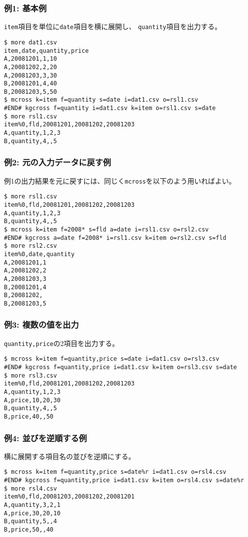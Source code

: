 \subsubsection*{例1: 基本例}

\verb|item|項目を単位に\verb|date|項目を横に展開し、
\verb|quantity|項目を出力する。


\begin{Verbatim}[baselinestretch=0.7,frame=single]
$ more dat1.csv
item,date,quantity,price
A,20081201,1,10
A,20081202,2,20
A,20081203,3,30
B,20081201,4,40
B,20081203,5,50
$ mcross k=item f=quantity s=date i=dat1.csv o=rsl1.csv
#END# kgcross f=quantity i=dat1.csv k=item o=rsl1.csv s=date
$ more rsl1.csv
item%0,fld,20081201,20081202,20081203
A,quantity,1,2,3
B,quantity,4,,5
\end{Verbatim}
\subsubsection*{例2: 元の入力データに戻す例}

例1の出力結果を元に戻すには、同じく\verb|mcross|を以下のよう用いればよい。


\begin{Verbatim}[baselinestretch=0.7,frame=single]
$ more rsl1.csv
item%0,fld,20081201,20081202,20081203
A,quantity,1,2,3
B,quantity,4,,5
$ mcross k=item f=2008* s=fld a=date i=rsl1.csv o=rsl2.csv
#END# kgcross a=date f=2008* i=rsl1.csv k=item o=rsl2.csv s=fld
$ more rsl2.csv
item%0,date,quantity
A,20081201,1
A,20081202,2
A,20081203,3
B,20081201,4
B,20081202,
B,20081203,5
\end{Verbatim}
\subsubsection*{例3: 複数の値を出力}

\verb|quantity,price|の2項目を出力する。


\begin{Verbatim}[baselinestretch=0.7,frame=single]
$ mcross k=item f=quantity,price s=date i=dat1.csv o=rsl3.csv
#END# kgcross f=quantity,price i=dat1.csv k=item o=rsl3.csv s=date
$ more rsl3.csv
item%0,fld,20081201,20081202,20081203
A,quantity,1,2,3
A,price,10,20,30
B,quantity,4,,5
B,price,40,,50
\end{Verbatim}
\subsubsection*{例4: 並びを逆順する例}

横に展開する項目名の並びを逆順にする。


\begin{Verbatim}[baselinestretch=0.7,frame=single]
$ mcross k=item f=quantity,price s=date%r i=dat1.csv o=rsl4.csv
#END# kgcross f=quantity,price i=dat1.csv k=item o=rsl4.csv s=date%r
$ more rsl4.csv
item%0,fld,20081203,20081202,20081201
A,quantity,3,2,1
A,price,30,20,10
B,quantity,5,,4
B,price,50,,40
\end{Verbatim}
